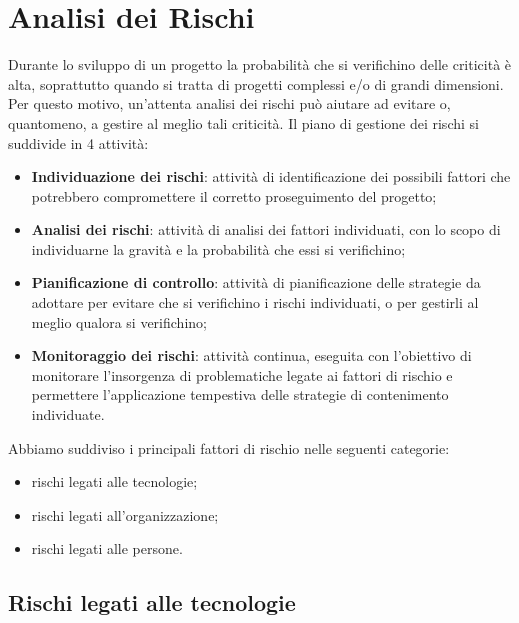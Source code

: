 \section{Analisi dei Rischi}
Durante lo sviluppo di un progetto la probabilità che si verifichino delle criticità è alta, 
soprattutto quando si tratta di progetti complessi e/o di grandi dimensioni. Per questo motivo,
un'attenta analisi dei rischi può aiutare ad evitare o, quantomeno, a gestire al meglio tali criticità.
Il piano di gestione dei rischi si suddivide in 4 attività:
\begin{itemize}
    \item \textbf{Individuazione dei rischi}: attività di identificazione dei possibili fattori che potrebbero compromettere il corretto proseguimento del progetto;
    \item \textbf{Analisi dei rischi}: attività di analisi dei fattori individuati, con lo scopo di individuarne la gravità e la probabilità che essi si verifichino;
    \item \textbf{Pianificazione di controllo}: attività di pianificazione delle strategie da adottare per evitare che si verifichino i rischi individuati, o per gestirli al meglio qualora si verifichino;
    \item \textbf{Monitoraggio dei rischi}: attività continua, eseguita con l'obiettivo di monitorare l'insorgenza di problematiche legate ai fattori di rischio e permettere l'applicazione tempestiva delle strategie di contenimento individuate.
\end{itemize}
Abbiamo suddiviso i principali fattori di rischio nelle seguenti categorie:
\begin{itemize}
    \item rischi legati alle tecnologie;
    \item rischi legati all’organizzazione;
    \item rischi legati alle persone.
\end{itemize}

\subsection{Rischi legati alle tecnologie}


